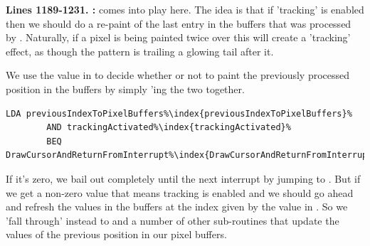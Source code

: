 \textbf{Lines 1189-1231. :} 
 comes into play here. The idea is that if 'tracking'
is enabled then we should do a re-paint of the last entry in the buffers that was
processed by . Naturally, if a pixel is being painted twice
over this will create a 'tracking' effect, as though the pattern is trailing a 
glowing tail after it.

We use the value in  to decide whether or not to paint
the previously processed position in the buffers by simply 'ing the
two together.

\begin{lstlisting}[escapechar=\%]
        LDA previousIndexToPixelBuffers%\index{previousIndexToPixelBuffers}%
        AND trackingActivated%\index{trackingActivated}%
        BEQ DrawCursorAndReturnFromInterrupt%\index{DrawCursorAndReturnFromInterrupt}%
\end{lstlisting}

If it's zero, we bail out
completely until the next interrupt by jumping to .
But if we get a non-zero value that means tracking is enabled and 
we should go ahead and refresh the values in the buffers at the index given
by the value in . So we 'fall through' instead to
 and a number of other sub-routines that update the
values of the previous position in our pixel buffers.

\clearpage
